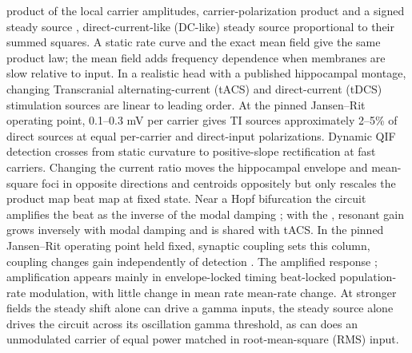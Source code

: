 \documentclass[11pt,a4paper]{article}
\providecommand{\DIFaddtex}[1]{{\protect\color{blue} \sf #1}} %
\providecommand{\DIFdeltex}[1]{{\protect\color{red} \scriptsize #1}} %
\providecommand{\DIFaddbegin}{} %
\providecommand{\DIFaddend}{} %
\providecommand{\DIFdelbegin}{} %
\providecommand{\DIFdelend}{} %
\providecommand{\DIFadd}[1]{\texorpdfstring{\DIFaddtex{#1}}{#1}} %
\providecommand{\DIFdel}[1]{\texorpdfstring{\DIFdeltex{#1}}{}} %
\begin{document}
\DIFdelbegin \DIFdel{product of the local carrier amplitudes, }\DIFdelend \DIFaddbegin \DIFadd{carrier-polarization product }\DIFaddend and a signed\DIFdelbegin \DIFdel{steady
source }\DIFdelend \DIFaddbegin \DIFadd{, direct-current-like (DC-like) steady source
proportional }\DIFaddend to their summed squares. \DIFdelbegin \DIFdel{A static rate curve and the exact
mean field give the same product law; the mean field adds frequency dependence
when membranes are slow relative to input. In a realistic head with a published hippocampal montage, changing }\DIFdelend \DIFaddbegin \DIFadd{Transcranial alternating-current (tACS) and direct-current (tDCS)
stimulation sources are linear to leading order. At the pinned
Jansen--Rit operating point, 0.1--0.3 mV per carrier gives TI sources approximately
2--5\% of direct sources at equal per-carrier and direct-input
polarizations. Dynamic QIF detection crosses from static curvature to positive-slope
rectification at fast carriers. Changing }\DIFaddend the current ratio moves the \DIFaddbegin \DIFadd{hippocampal
}\DIFaddend envelope and mean-square \DIFdelbegin \DIFdel{foci in opposite directions and }\DIFdelend \DIFaddbegin \DIFadd{centroids oppositely but }\DIFaddend only rescales the \DIFdelbegin \DIFdel{product map }\DIFdelend \DIFaddbegin \DIFadd{beat map at
fixed state}\DIFaddend . Near a Hopf bifurcation\DIFdelbegin \DIFdel{the
circuit amplifies the beat as the inverse of the modal damping
; with the
}\DIFdelend \DIFaddbegin \DIFadd{, resonant gain grows inversely with modal damping
and is shared with tACS. In the pinned }\DIFaddend Jansen--Rit \DIFdelbegin \DIFdel{operating point held fixed, synaptic coupling sets this }\DIFdelend \DIFaddbegin \DIFadd{column, coupling changes }\DIFaddend gain
independently of detection\DIFdelbegin \DIFdel{. The amplified response }\DIFdelend \DIFaddbegin \DIFadd{; amplification }\DIFaddend appears mainly in \DIFdelbegin \DIFdel{envelope-locked timing}\DIFdelend \DIFaddbegin \DIFadd{beat-locked population-rate
modulation}\DIFaddend , with little \DIFdelbegin \DIFdel{change in mean rate}\DIFdelend \DIFaddbegin \DIFadd{mean-rate change}\DIFaddend . At stronger \DIFdelbegin \DIFdel{fields the steady shift alone can drive a gamma }\DIFdelend \DIFaddbegin \DIFadd{inputs, the steady source alone drives the }\DIFaddend circuit across its \DIFdelbegin \DIFdel{oscillation }\DIFdelend \DIFaddbegin \DIFadd{gamma
}\DIFaddend threshold, as \DIFdelbegin \DIFdel{can }\DIFdelend \DIFaddbegin \DIFadd{does }\DIFaddend an unmodulated carrier \DIFdelbegin \DIFdel{of equal power}\DIFdelend \DIFaddbegin \DIFadd{matched in root-mean-square (RMS) input}\DIFaddend .\
\end{document}
